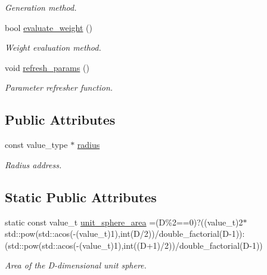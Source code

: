 \begin{DoxyCompactItemize}
\begin{DoxyCompactList}\small\item\em Generation method. \end{DoxyCompactList}\item 
\hypertarget{a00566_ae516b42f3f00e0fff703e9e9804ba846}{}bool \hyperlink{a00566_ae516b42f3f00e0fff703e9e9804ba846}{evaluate\+\_\+weight} ()\label{a00566_ae516b42f3f00e0fff703e9e9804ba846}

\begin{DoxyCompactList}\small\item\em Weight evaluation method. \end{DoxyCompactList}\item 
\hypertarget{a00566_a1529ff9a6ade83f812e5f352d82ac40f}{}void \hyperlink{a00566_a1529ff9a6ade83f812e5f352d82ac40f}{refresh\+\_\+params} ()\label{a00566_a1529ff9a6ade83f812e5f352d82ac40f}

\begin{DoxyCompactList}\small\item\em Parameter refresher function. \end{DoxyCompactList}\end{DoxyCompactItemize}
\subsection*{Public Attributes}
\begin{DoxyCompactItemize}
\item 
\hypertarget{a00566_a6bf77d5905741c78b3337c17f617f731}{}const value\+\_\+type $\ast$ \hyperlink{a00566_a6bf77d5905741c78b3337c17f617f731}{radius}\label{a00566_a6bf77d5905741c78b3337c17f617f731}

\begin{DoxyCompactList}\small\item\em Radius address. \end{DoxyCompactList}\end{DoxyCompactItemize}
\subsection*{Static Public Attributes}
\begin{DoxyCompactItemize}
\item 
\hypertarget{a00566_a93682440646ecd7e6caaf4f6951f65ac}{}static const value\+\_\+t \hyperlink{a00566_a93682440646ecd7e6caaf4f6951f65ac}{unit\+\_\+sphere\+\_\+area} =(D\%2==0)?((value\+\_\+t)2$\ast$std\+::pow(std\+::acos(-\/(value\+\_\+t)1),int(D/2))/double\+\_\+factorial(D-\/1))\+:(std\+::pow(std\+::acos(-\/(value\+\_\+t)1),int((D+1)/2))/double\+\_\+factorial(D-\/1))\label{a00566_a93682440646ecd7e6caaf4f6951f65ac}

\begin{DoxyCompactList}\small\item\em Area of the D-\/dimensional unit sphere. \end{DoxyCompactList}\end{DoxyCompactItemize}


